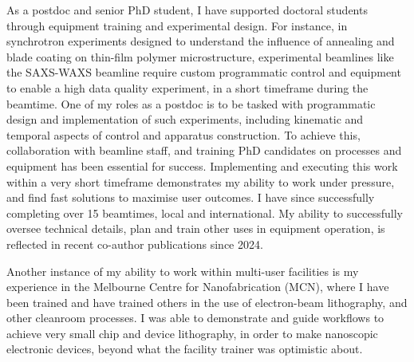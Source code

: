 \documentclass[10pt,a4paper,ragged2e,withhyper,paragraphstrue]{altacv}
\begin{document}
{    %
    As a postdoc and senior PhD student, I have supported doctoral students through equipment training and experimental design. For instance, in    synchrotron experiments designed to understand the influence of annealing and blade coating on thin-film polymer microstructure, experimental beamlines like the SAXS-WAXS beamline require custom programmatic control and equipment to enable a high data quality experiment, in a short timeframe during the beamtime. One of my roles as a postdoc is to be tasked with programmatic design and implementation of such experiments, including kinematic and temporal aspects of control and apparatus construction. To achieve this, collaboration with beamline staff, and training PhD candidates on processes and equipment has been essential for success. Implementing and executing this work within a very short timeframe demonstrates my ability to work under pressure, and find fast solutions to maximise user outcomes.
    I have since successfully completing over 15 beamtimes, local and international. My ability to successfully oversee technical details, plan and train other uses in equipment operation, is reflected in recent co-author publications since 2024.

    Another instance of my ability to work within multi-user facilities is my experience in the Melbourne Centre for Nanofabrication (MCN), where I have been trained and have trained others in the use of electron-beam lithography, and other cleanroom processes. I was able to demonstrate and guide workflows to achieve very small chip and device lithography, in order to make nanoscopic electronic devices, beyond what the facility trainer was optimistic about. 
    
}
\end{document}
